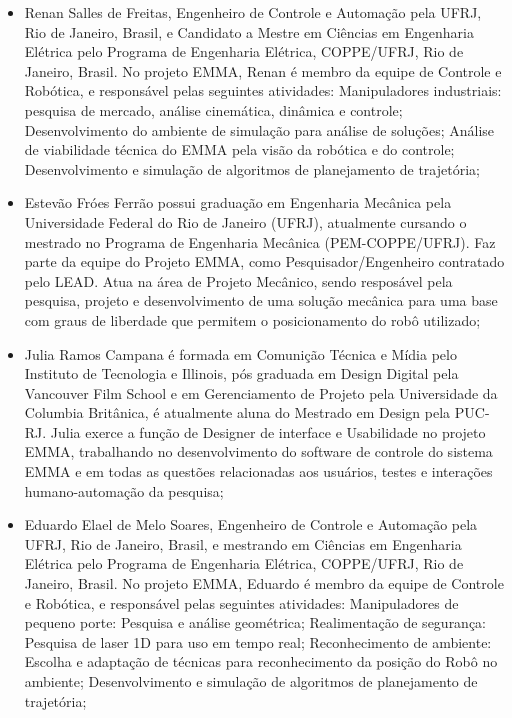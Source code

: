 \begin{itemize}
  \item Renan Salles de Freitas, Engenheiro de Controle e
Automação pela UFRJ, Rio de Janeiro, Brasil, e Candidato a Mestre em Ciências em Engenharia Elétrica
pelo Programa de Engenharia Elétrica, COPPE/UFRJ, Rio de Janeiro, Brasil. No
projeto EMMA, Renan é membro da equipe de Controle e Robótica, e responsável
pelas seguintes atividades: Manipuladores industriais: pesquisa de
mercado, análise cinemática, dinâmica e controle; Desenvolvimento do ambiente de
simulação para análise de soluções; Análise de viabilidade técnica do EMMA pela
visão da robótica e do controle; Desenvolvimento e simulação de algoritmos de
planejamento de trajetória;

  \item Estevão Fróes Ferrão possui graduação em Engenharia Mecânica pela Universidade
Federal do Rio de Janeiro (UFRJ), atualmente cursando o mestrado no Programa de Engenharia
Mecânica (PEM-COPPE/UFRJ). Faz parte da equipe do Projeto EMMA, como
Pesquisador/Engenheiro contratado pelo LEAD. Atua na área de Projeto Mecânico,
sendo resposável pela pesquisa, projeto e desenvolvimento de uma solução
mecânica para uma base com graus de liberdade que permitem o posicionamento do
robô utilizado;

\item Julia Ramos Campana é formada em Comunição Técnica e Mídia pelo Instituto de
Tecnologia e Illinois, pós graduada em Design Digital pela Vancouver Film School
e em Gerenciamento de Projeto pela Universidade da Columbia Britânica, é
atualmente aluna do Mestrado em Design pela PUC-RJ. Julia exerce a função de
Designer de interface e Usabilidade no projeto EMMA, trabalhando no
desenvolvimento do software de controle do sistema EMMA e em todas as questões
relacionadas aos usuários, testes e interações humano-automação da pesquisa;

\item Eduardo Elael de Melo Soares, Engenheiro de Controle e Automação pela UFRJ, Rio
de Janeiro, Brasil, e mestrando em Ciências em Engenharia Elétrica pelo
Programa de Engenharia Elétrica, COPPE/UFRJ, Rio de Janeiro, Brasil. No projeto
EMMA, Eduardo é membro da equipe de Controle e Robótica, e responsável pelas
seguintes atividades: Manipuladores de pequeno porte: Pesquisa e análise
geométrica; Reali\-mentação de segurança: Pesquisa de laser 1D para uso em tempo
real; Reconhecimento de ambiente: Escolha e adaptação de técnicas para
reconhecimento da posição do Robô no ambiente; Desenvolvimento e simulação de
algoritmos de planejamento de trajetória;


\end{itemize}

